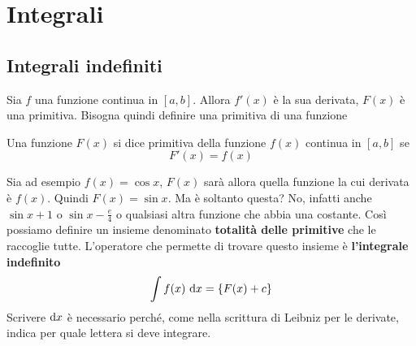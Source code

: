
\section{Integrali}
\subsection{Integrali indefiniti}
Sia $f$ una funzione continua in $[{a,b}]$. Allora $f'(x)$ è la sua derivata, $F(x)$ è una primitiva.
Bisogna quindi definire una primitiva di una funzione
\begin{primitiva}
  Una funzione $F(x)$ si dice primitiva della funzione $f(x)$ continua in $[{a,b}]$ se
  \begin{equation*}
    F'(x) = f(x)
  \end{equation*}
\end{primitiva}
Sia ad esempio $f(x) = \cos x$, $F(x)$ sarà allora quella funzione la cui derivata è $f(x)$. Quindi
$F(x)=\sin x$. Ma è soltanto questa? No, infatti anche $\sin x +1$ o $\sin x -\frac{e}{4}$ o 
qualsiasi altra funzione che abbia una costante. Così possiamo definire un insieme denominato
\textbf{totalità delle primitive} che le raccoglie tutte. L'operatore che permette di trovare questo
insieme è \textbf{l'integrale indefinito}
\begin{equation*}
  \int f(x)\,\mathop{}\!\mathrm{d} x = \{F(x)+c\}
\end{equation*}
Scrivere $\mathop{}\!\mathrm{d} x$ è necessario perché, come nella scrittura di Leibniz per le derivate, indica per
quale lettera si deve integrare.

